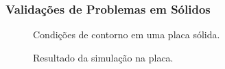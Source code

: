 \documentclass{beamer}
\begin{document}
\begin{frame}
  \frametitle{Validações de Problemas em Sólidos}
  
  \begin{minipage}{.48\textwidth}
    \centering
    \begin{figure}
       {\raggedleft \tiny Condições de contorno em uma placa sólida.}
    \end{figure}
  \end{minipage}
  \hfill
  \begin{minipage}{.48\textwidth}
    \begin{figure}
       {\raggedleft \tiny Resultado da simulação na placa.}
    \end{figure}
  \end{minipage}
  

\end{frame}
\end{document}
